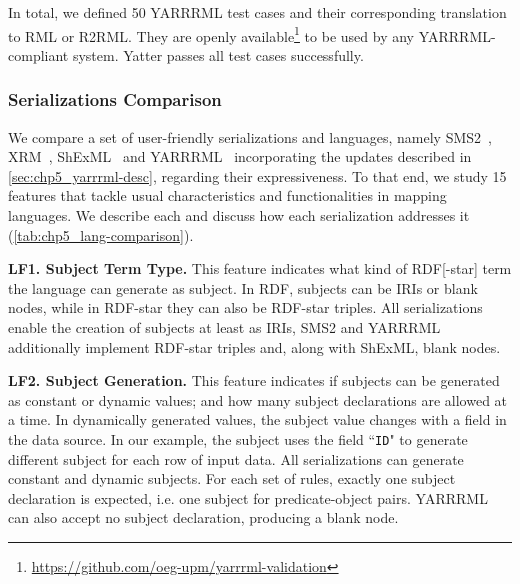 In total, we defined 50 YARRRML test cases and their corresponding translation to RML or R2RML. 
They are openly available\footnote{\label{foot:yarrrml-resources}\url{https://github.com/oeg-upm/yarrrml-validation}} to be used by any YARRRML-compliant system.
Yatter passes all test cases successfully. %


\subsubsection{Serializations Comparison} %





We compare a set of user-friendly serializations and languages, namely SMS2~\parencite{sms2}, XRM~\parencite{xrm}, ShExML~\parencite{Garcia-Gonzalez2020shexml} and YARRRML~\parencite{Heyvaert2018yarrrml} incorporating the updates described in \cref{sec:chp5_yarrrml-desc}, regarding their expressiveness. 
To that end, we study 15 features that tackle usual characteristics and functionalities in mapping languages.
We describe each and discuss how each serialization addresses it (\cref{tab:chp5_lang-comparison}). 

\textbf{LF1. Subject Term Type.} 
This feature indicates what kind of RDF[-star] term the language can generate as subject.
In RDF, subjects can be IRIs or blank nodes, while in RDF-star they can also be RDF-star triples.
All serializations enable the creation of subjects at least as IRIs, SMS2 and YARRRML additionally implement RDF-star triples and, along with ShExML, blank nodes.

\textbf{LF2. Subject Generation.} 
This feature indicates if subjects can be generated as constant or dynamic values; and how many subject declarations are allowed at a time. In dynamically generated values, the subject value changes with a field in the data source. In our example, the subject uses the field ``\texttt{ID}" to generate different subject for each row of input data. %
All serializations can generate constant and dynamic subjects. For each set of rules, exactly one subject declaration is expected, i.e. one subject for predicate-object pairs. YARRRML can also accept no subject declaration, producing a blank node. %


